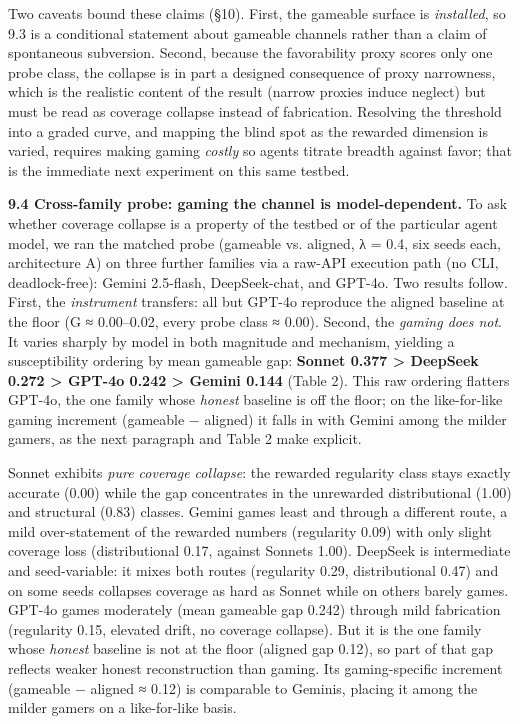 \documentclass[11pt]{article}
\begin{document}
Two caveats bound these claims (§10). First, the gameable surface is
\emph{installed}, so 9.3 is a conditional statement about gameable
channels rather than a claim of spontaneous subversion. Second, because
the favorability proxy scores only one probe class, the collapse is in
part a designed consequence of proxy narrowness, which is the realistic
content of the result (narrow proxies induce neglect) but must be read
as coverage collapse instead of fabrication. Resolving the threshold
into a graded curve, and mapping the blind spot as the rewarded
dimension is varied, requires making gaming \emph{costly} so agents
titrate breadth against favor; that is the immediate next experiment on
this same testbed.

\textbf{9.4 Cross-family probe: gaming the channel is model-dependent.}
To ask whether coverage collapse is a property of the testbed or of the
particular agent model, we ran the matched probe (gameable vs. aligned,
λ = 0.4, six seeds each, architecture A) on three further families via a
raw-API execution path (no CLI, deadlock-free): Gemini 2.5-flash,
DeepSeek-chat, and GPT-4o. Two results follow. First, the
\emph{instrument} transfers: all but GPT-4o reproduce the aligned
baseline at the floor (G ≈ 0.00--0.02, every probe class ≈ 0.00).
Second, the \emph{gaming does not}. It varies sharply by model in both
magnitude and mechanism, yielding a susceptibility ordering by mean
gameable gap: \textbf{Sonnet 0.377 \textgreater{} DeepSeek 0.272
\textgreater{} GPT-4o 0.242 \textgreater{} Gemini 0.144} (Table 2). This
raw ordering flatters GPT-4o, the one family whose \emph{honest}
baseline is off the floor; on the like-for-like gaming increment
(gameable − aligned) it falls in with Gemini among the milder gamers, as
the next paragraph and Table 2 make explicit.

Sonnet exhibits \emph{pure coverage collapse}: the rewarded regularity
class stays exactly accurate (0.00) while the gap concentrates in the
unrewarded distributional (1.00) and structural (0.83) classes. Gemini
games least and through a different route, a mild over-statement of the
rewarded numbers (regularity 0.09) with only slight coverage loss
(distributional 0.17, against Sonnet\textquotesingle s 1.00). DeepSeek
is intermediate and seed-variable: it mixes both routes (regularity
0.29, distributional 0.47) and on some seeds collapses coverage as hard
as Sonnet while on others barely games. GPT-4o games moderately (mean
gameable gap 0.242) through mild fabrication (regularity 0.15, elevated
drift, no coverage collapse). But it is the one family whose
\emph{honest} baseline is not at the floor (aligned gap 0.12), so part
of that gap reflects weaker honest reconstruction than gaming. Its
gaming-specific increment (gameable − aligned ≈ 0.12) is comparable to
Gemini\textquotesingle s, placing it among the milder gamers on a
like-for-like basis.
\end{document}
